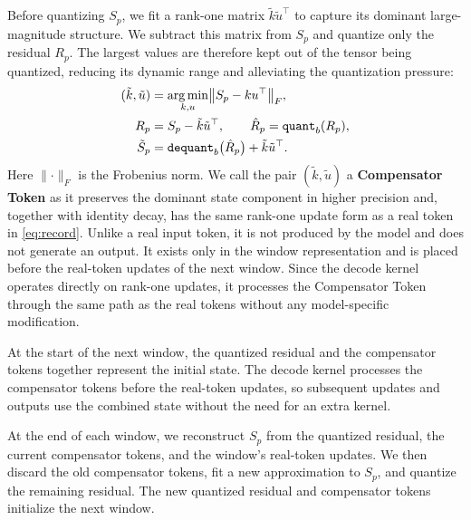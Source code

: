 Before quantizing $S_p$, we fit a rank-one matrix $\tilde k\tilde u^{\top}$ to capture its dominant large-magnitude structure.
We subtract this matrix from $S_p$ and quantize only the residual $R_p$.
The largest values are therefore kept out of the tensor being quantized, reducing its dynamic range and alleviating the quantization pressure:
\begin{equation}
  \begin{aligned}
    (\tilde k,\tilde u)
       &= \operatorname*{arg\,min}_{k,u}
          \bigl\lVert S_p-ku^{\top}\bigr\rVert_F,\\
    R_p &= S_p-\tilde k\tilde u^{\top},
       \qquad \hat R_p=\operatorname{\mathtt{quant}}_b(R_p),\\
    \tilde S_p &= \operatorname{\mathtt{dequant}}_b\bigl(\hat R_p\bigr)
       +\tilde k\tilde u^{\top}.
  \end{aligned}
  \label{eq:compensator}
\end{equation}
Here $\lVert\cdot\rVert_F$ is the Frobenius norm.
We call the pair $(\tilde k,\tilde u)$ a \textbf{Compensator Token} as it preserves the dominant state component in higher precision and, together with identity decay, has the same rank-one update form as a real token in \eqref{eq:record}.
Unlike a real input token, it is not produced by the model and does not generate an output.
It exists only in the window representation and is placed before the real-token updates of the next window.
Since the decode kernel operates directly on rank-one updates, it processes the Compensator Token through the same path as the real tokens without any model-specific modification.

At the start of the next window, the quantized residual and the compensator tokens together represent the initial state.
The decode kernel processes the compensator tokens before the real-token updates, so subsequent updates and outputs use the combined state without the need for an extra kernel.

At the end of each window, we reconstruct $S_p$ from the quantized residual, the current compensator tokens, and the window's real-token updates.
We then discard the old compensator tokens, fit a new approximation to $S_p$, and quantize the remaining residual.
The new quantized residual and compensator tokens initialize the next window.



